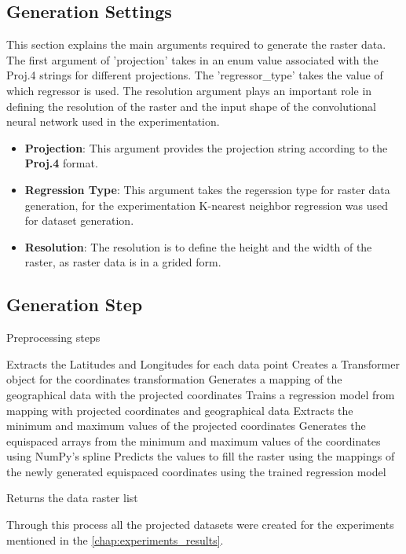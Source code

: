 \subsection{Generation Settings}
This section explains the main arguments required to generate the raster data. The first argument of 'projection' takes in an enum value associated with the Proj.4 strings for different projections. The 'regressor\_type' takes the value of which regressor is used. The resolution argument plays an important role in defining the resolution of the raster and the input shape of the convolutional neural network used in the experimentation.
\begin{itemize}
    \item \textbf{Projection}: This argument provides the projection string according to the \textbf{Proj.4} format.
    \item  \textbf{Regression Type}: This argument takes the regerssion type for raster data generation, for the experimentation K-nearest neighbor regression was used for dataset generation.
    \item \textbf{Resolution}: The resolution is to define the height and the width of the raster, as raster data is in a grided form.
\end{itemize}


\subsection{Generation Step}
\begin{algorithm}
    \caption{Preprocessing steps}
    \label{}
    \begin{algorithmic}[1]
        \STATE Extracts the Latitudes and Longitudes for each data point
        \STATE Creates a Transformer object for the coordinates transformation
        \STATE Generates a mapping of the geographical data with the projected coordinates
        \STATE Trains a regression model from mapping with projected coordinates and geographical data
        \STATE Extracts the minimum and maximum values of the projected coordinates
        \STATE Generates the equispaced arrays from the minimum and maximum values of the coordinates using NumPy's spline
        \STATE Predicts the values to fill the raster using the mappings of the newly generated equispaced coordinates  using the trained regression model

        \ENDFOR
        \STATE Returns the data raster list
    \end{algorithmic}
\end{algorithm}

Through this process all the projected datasets were created for the experiments mentioned in the \autoref{chap:experiments_results}.
